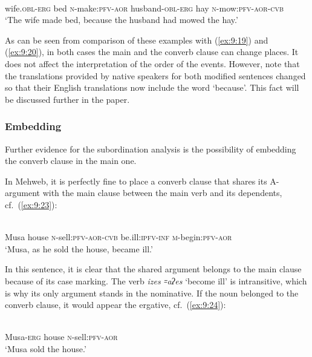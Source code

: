 ﻿\documentclass[output=paper]{langsci/langscibook}
\begin{document}
\ex \label{ex:9:22} %
\\
wife.\textsc{obl}-\textsc{erg} bed \textsc{n}-make:\textsc{pfv}-\textsc{aor} husband-\textsc{obl}-\textsc{erg} hay \textsc{n}-mow:\textsc{pfv}-\textsc{aor}-\textsc{cvb}\\
\glt `The wife made bed, because the husband had mowed the hay.'

\z

As can be seen from comparison of these examples with (\ref{ex:9:19}) and (\ref{ex:9:20}), in both cases the main and
the converb clause can change places. It does not affect the interpretation of the order of
the events. However, note that the translations provided by native speakers
for both modified sentences changed so that their English translations now include the word `because'. 
This fact will be discussed further in the paper.

\subsubsection{Embedding}\label{embedding}


Further evidence for the subordination analysis is the possibility of
embedding the converb clause in the main one.

In Mehweb, it is perfectly fine to place a converb clause that shares
its A-argument with the main clause between the main verb and its
dependents, cf.\ (\ref{ex:9:23}):

\ea \label{ex:9:23} %
\\
Musa house \textsc{n}-sell:\textsc{pfv}-\textsc{aor}-\textsc{cvb} be.ill:\textsc{ipfv}-\textsc{inf} \textsc{m}-begin:\textsc{pfv}-\textsc{aor}\\
\glt `Musa, as he sold the house, became ill.'
\z

In this sentence, it is clear that the shared argument belongs to the
main clause because of its case marking. The verb \emph{izes ꞊aʔes} 
`become ill' is intransitive, which is why its only argument stands in
the nominative. If the noun belonged to the converb clause, it would appear 
the ergative, cf.\ (\ref{ex:9:24}):

\ea \label{ex:9:24} %
\\
Musa-\textsc{erg} house \textsc{n}-sell:\textsc{pfv}-\textsc{aor}\\
\glt `Musa sold the house.'
\z
\end{document}
